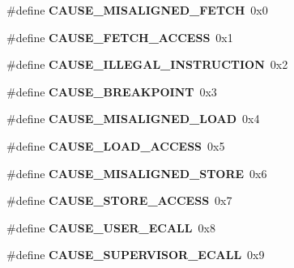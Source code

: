 \begin{DoxyCompactItemize}
\item 
\mbox{\label{riscv-utility_8h_aa0f507b2b11ba1d8f9e1675775646919}} 
\#define {\bfseries C\+A\+U\+S\+E\+\_\+\+M\+I\+S\+A\+L\+I\+G\+N\+E\+D\+\_\+\+F\+E\+T\+CH}~0x0
\item 
\mbox{\label{riscv-utility_8h_ab86839d39d3fa1bd63746f206e60f700}} 
\#define {\bfseries C\+A\+U\+S\+E\+\_\+\+F\+E\+T\+C\+H\+\_\+\+A\+C\+C\+E\+SS}~0x1
\item 
\mbox{\label{riscv-utility_8h_a0b365435966c2ba620824668ecd09006}} 
\#define {\bfseries C\+A\+U\+S\+E\+\_\+\+I\+L\+L\+E\+G\+A\+L\+\_\+\+I\+N\+S\+T\+R\+U\+C\+T\+I\+ON}~0x2
\item 
\mbox{\label{riscv-utility_8h_aabd6ef7192e2092f6914447d808f838d}} 
\#define {\bfseries C\+A\+U\+S\+E\+\_\+\+B\+R\+E\+A\+K\+P\+O\+I\+NT}~0x3
\item 
\mbox{\label{riscv-utility_8h_a12723f26b86c321bdde190c119aee4be}} 
\#define {\bfseries C\+A\+U\+S\+E\+\_\+\+M\+I\+S\+A\+L\+I\+G\+N\+E\+D\+\_\+\+L\+O\+AD}~0x4
\item 
\mbox{\label{riscv-utility_8h_aa7febff9daeeeebe99516d348b095cf1}} 
\#define {\bfseries C\+A\+U\+S\+E\+\_\+\+L\+O\+A\+D\+\_\+\+A\+C\+C\+E\+SS}~0x5
\item 
\mbox{\label{riscv-utility_8h_ad9517090b55edb5b56751c969280f17d}} 
\#define {\bfseries C\+A\+U\+S\+E\+\_\+\+M\+I\+S\+A\+L\+I\+G\+N\+E\+D\+\_\+\+S\+T\+O\+RE}~0x6
\item 
\mbox{\label{riscv-utility_8h_a312d759269176ae93ace44f2ed5863d2}} 
\#define {\bfseries C\+A\+U\+S\+E\+\_\+\+S\+T\+O\+R\+E\+\_\+\+A\+C\+C\+E\+SS}~0x7
\item 
\mbox{\label{riscv-utility_8h_ad313934ea20c1ab3491e2d52d4ad558b}} 
\#define {\bfseries C\+A\+U\+S\+E\+\_\+\+U\+S\+E\+R\+\_\+\+E\+C\+A\+LL}~0x8
\item 
\mbox{\label{riscv-utility_8h_ac3c506d6261a143953d856b85a47b707}} 
\#define {\bfseries C\+A\+U\+S\+E\+\_\+\+S\+U\+P\+E\+R\+V\+I\+S\+O\+R\+\_\+\+E\+C\+A\+LL}~0x9

\end{DoxyCompactItemize}

